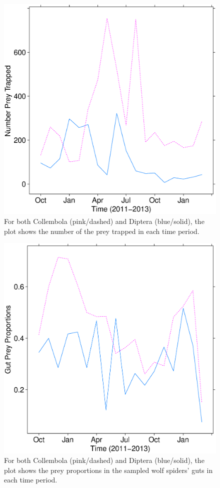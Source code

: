 \documentclass[12pt]{article}
\begin{document}
\begin{figure}
  \centering
  \includegraphics[scale=0.35]{prey_trapped}
  \caption{For both Collembola (pink/dashed) and Diptera (blue/solid), the plot shows the number of the prey trapped in each time period.}
  \label{fig:trapped}
\end{figure}

\begin{figure}
  \centering
  \includegraphics[scale=0.35]{prey_props}
  \caption{For both Collembola (pink/dashed) and Diptera (blue/solid), the plot shows the prey proportions in the sampled wolf spiders' guts in each time period.}
  \label{fig:props}
\end{figure}
\end{document}
